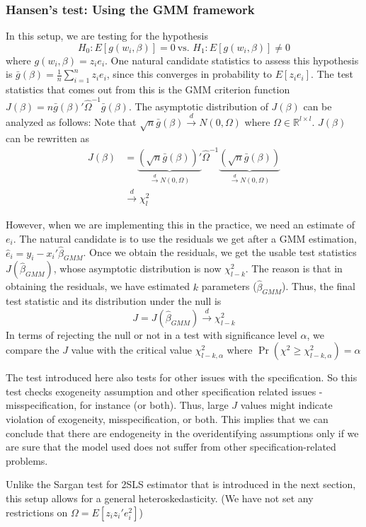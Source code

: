 \documentclass[12pt]{article}
\theoremstyle{definition}
\theoremstyle{property}
\theoremstyle{assumption}
\theoremstyle{example}
\theoremstyle{comment}
\begin{document}
\subsubsection{Hansen's test: Using the GMM framework}
In this setup, we are testing for the hypothesis 
\[
H_0: E[g(w_i,\beta)]=0 \ \text{vs. } H_1: E[g(w_i,\beta)]\neq0
\]
where $g(w_i,\beta)=z_ie_i$. One natural candidate statistics to assess this hypothesis is $\bar{g}(\beta)=\frac{1}{n}\sum_{i=1}^n z_ie_i$, since this converges in probability to $E[z_ie_i]$. The test statistics that comes out from this is the GMM criterion function $J(\beta)=n\bar{g}(\beta)'\widehat{\Omega}^{-1}\bar{g}(\beta)$. The asymptotic distribution of $J(\beta)$ can be analyzed as follows: Note that $\sqrt{n}\bar{g}(\beta)\xrightarrow{d}N(0,\Omega)$ where $\Omega\in\mathbb{R}^{l\times l}$. $J(\beta)$ can be rewritten as
\[
\begin{aligned}
J(\beta)&= \underbrace{\left(\sqrt{n}\bar{g}(\beta) \right)'}_{\xrightarrow{d}N(0,\Omega)} \widehat{\Omega}^{-1}\underbrace{\left(\sqrt{n}\bar{g}(\beta) \right)}_{\xrightarrow{d}N(0,\Omega)}\\
&\xrightarrow{d} \chi^2_l
\end{aligned}
\] \par
However, when we are implementing this in the practice, we need an estimate of $e_i$. The natural candidate is to use the residuals we get after a GMM estimation, $\hat{e}_i = y_i-x_i'\hat{\beta}_{GMM}$. Once we obtain the residuals, we get the usable test statistics $J(\hat{\beta}_{GMM})$, whose asymptotic distribution is now $\chi_{l-k}^2$. The reason is that in obtaining the residuals, we have estimated $k$ parameters ($\hat{\beta}_{GMM}$). Thus, the final test statistic and its distribution under the null is
\[
J=J(\hat{\beta}_{GMM})\xrightarrow{d} \chi_{l-k}^2
\] 
In terms of rejecting the null or not in a test with significance level $\alpha$, we compare the $J$ value with the critical value $\chi_{l-k, \alpha}^2$ where $\Pr(\chi^2\geq\chi_{l-k, \alpha}^2) = \alpha$

\par
The test introduced here also tests for other issues with the specification. So this test checks exogeneity assumption and other specification related issues - misspecification, for instance (or both). Thus, large $J$ values might indicate violation of exogeneity, misspecification, or both. This implies that we can conclude that there are endogeneity in the overidentifying assumptions only if we are sure that the model used does not suffer from other specification-related problems.
\par
Unlike the Sargan test for 2SLS estimator that is introduced in the next section, this setup allows for a general heteroskedasticity. (We have not set any restrictions on $\Omega = E[z_iz_i'e_i^2]$)
\end{document}
